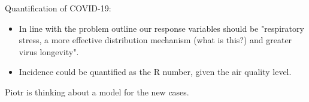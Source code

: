 Quantification of COVID-19:
\begin{itemize}
\item In line with the problem outline our response variables should be "respiratory stress, a more effective distribution mechanism (what is this?) and greater virus longevity".
\item Incidence could be quantified as the R number, given the air quality level.
\end{itemize}

Piotr is thinking about a model for the new cases.